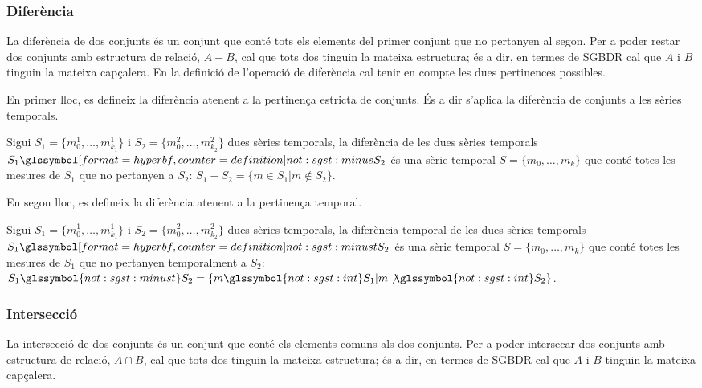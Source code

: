 \subsubsection{Diferència}

La diferència de dos conjunts és un conjunt que conté tots els
elements del primer conjunt que no pertanyen al segon.  Per a poder
restar dos conjunts amb estructura de relació, $A - B$, cal que tots
dos tinguin la mateixa estructura; és a dir, en termes de \gls{SGBDR}
cal que $A$ i $B$ tinguin la mateixa capçalera.
En la definició de l'operació de diferència cal tenir en compte les
dues pertinences possibles.

En primer lloc, es defineix la diferència atenent a la pertinença
estricta de conjunts. És a dir s'aplica la diferència de
conjunts a les sèries temporals.
\begin{definition}[Diferència]
  Sigui $S_1=\{m_0^1, \dotsc, m_{k_1}^1\}$ i $S_2=\{m_0^2, \dotsc,
  m_{k_2}^2\}$ dues sèries temporals, la diferència de les dues sèries
  temporals $S_1 \glssymboldef{not:sgst:minus} S_2$ és una sèrie
  temporal $S=\{m_0, \dotsc, m_k\}$ que conté totes les mesures de
  $S_1$ que no pertanyen a $S_2$: $S_1 - S_2 = \{ m \in S_1 | m \notin
  S_2 \}$.
\end{definition}

En segon lloc, es defineix la diferència atenent a la pertinença
temporal.
\begin{definition}
  Sigui $S_1=\{m_0^1, \dotsc, m_{k_1}^1\}$ i $S_2=\{m_0^2, \dotsc,
  m_{k_2}^2\}$ dues sèries temporals, la diferència temporal de les
  dues sèries temporals $S_1 \glssymboldef{not:sgst:minust} S_2$ és
  una sèrie temporal $S=\{m_0, \dotsc, m_k\}$ que conté totes les
  mesures de $S_1$ que no pertanyen temporalment a $S_2$: $S_1
  \glssymbol{not:sgst:minust} S_2 = \{ m \glssymbol{not:sgst:int} S_1 | m
  \not\glssymbol{not:sgst:int} S_2 \}$.
\end{definition}




\subsubsection{Intersecció}

La intersecció de dos conjunts és un conjunt que conté els elements
comuns als dos conjunts.  Per a poder intersecar dos conjunts amb estructura
de relació, $A \cap B$, cal que tots dos tinguin la mateixa
estructura; és a dir, en termes de \gls{SGBDR} cal que $A$ i $B$ tinguin la
mateixa capçalera.


